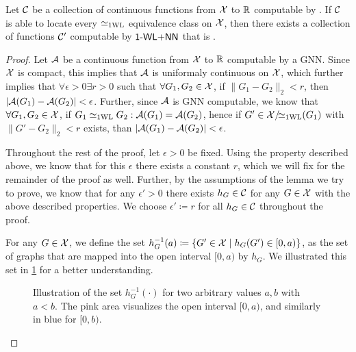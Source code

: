 \begin{lemma}\label{lem:continuous_proof2}
    Let $\mathcal{C}$ be a collection of continuous functions from $\mathcal{X}$ to $\mathbb{R}$ computable by \wlnn. If $\mathcal{C}$ is able to locate every $\simeq_{\text{1WL}}$ equivalence class on $\mathcal{X}$, then there exists a collection of functions $\mathcal{C}'$ computable by $\textsf{1-WL+NN}$ that is \gapp.
\end{lemma}

\begin{proof}
    Let $\mathcal{A}$ be a continuous function from $\mathcal{X}$ to $\mathbb{R}$ computable by a GNN. Since $\mathcal{X}$ is compact, this implies that $\mathcal{A}$ is uniformaly continuous on $\mathcal{X}$, which further implies that $\forall \epsilon > 0 \exists r > 0$ such that $\forall G_1, G_2 \in \mathcal{X}$, if $\| G_1 - G_2 \|_2 < r$, then $|\mathcal{A}(G_1) - \mathcal{A}(G_2)| < \epsilon$. Further, since $\mathcal{A}$ is GNN computable, we know that $\forall G_1, G_2 \in \mathcal{X}$, if $G_1 \simeq_{\text{1WL}} G_2: \mathcal{A}(G_1) = \mathcal{A}(G_2)$, hence if $G' \in \mathcal{X}/\!{\simeq_{\text{1WL}}}(G_1)$ with $\| G' - G_2 \|_2 < r$ exists, than $|\mathcal{A}(G_1) - \mathcal{A}(G_2)| < \epsilon$.\newline

    Throughout the rest of the proof, let $\epsilon > 0$ be fixed. Using the property described above, we know that for this $\epsilon$ there exists a constant $r$, which we will fix for the remainder of the proof as well. Further, by the assumptions of the lemma we try to prove, we know that for any $\epsilon' > 0$ there exists $h_{G} \in \mathcal{C}$ for any $G \in \mathcal{X}$ with the above described properties. We choose $\epsilon' \coloneqq r$ for all $h_{G} \in \mathcal{C}$ throughout the proof.\newline

    For any $G \in \mathcal{X}$, we define the set $h_{G}^{-1}(a) \coloneqq \{ G' \in \mathcal{X} \mid h_G(G') \in [0, a) \}$, as the set of graphs that are mapped into the open interval $[0, a)$ by $h_G$. We illustrated this set in \cref{fig:continuous_proof2} for a better understanding.
    
    \begin{figure}[H]
        \centering
        
        \caption{Illustration of the set $h_{G}^{-1}(\cdot)$ for two arbitrary values $a,b$ with $a < b$. The pink area visualizes the open interval $[0, a)$, and similarly in blue for $[0, b)$.}
        \label{fig:continuous_proof2}
    \end{figure}
    

\end{proof}
